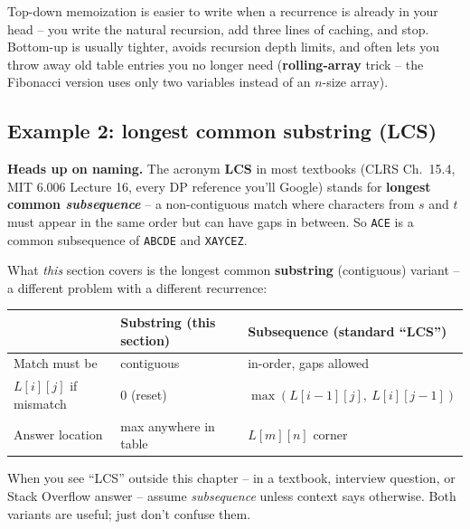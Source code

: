 \documentclass[11pt]{article}
\begin{document}
\begin{ideabox}
Top-down memoization is easier to write when a recurrence is already
in your head -- you write the natural recursion, add three lines of
caching, and stop. Bottom-up is usually tighter, avoids recursion
depth limits, and often lets you throw away old table entries you no
longer need (\textbf{rolling-array} trick -- the Fibonacci version
uses only two variables instead of an $n$-size array).
\end{ideabox}

\subsection{Example 2: longest common substring (LCS)}

\begin{notebox}
\textbf{Heads up on naming.} The acronym \textbf{LCS} in most
textbooks (CLRS Ch.~15.4, MIT 6.006 Lecture 16, every DP reference
you'll Google) stands for \textbf{longest common \emph{subsequence}}
-- a non-contiguous match where characters from $s$ and $t$ must
appear in the same order but can have gaps in between. So
\texttt{ACE} is a common subsequence of \texttt{ABCDE} and
\texttt{XAYCEZ}.

What \emph{this} section covers is the longest common
\textbf{substring} (contiguous) variant -- a different problem with
a different recurrence:

\begin{center}
\small
\begin{tabular}{lll}
& \textbf{Substring (this section)} & \textbf{Subsequence (standard ``LCS'')} \\
\hline
Match must be          & contiguous          & in-order, gaps allowed \\
$L[i][j]$ if mismatch  & $0$ (reset)         & $\max(L[i{-}1][j],\ L[i][j{-}1])$ \\
Answer location        & max anywhere in table & $L[m][n]$ corner \\
\end{tabular}
\normalsize
\end{center}

When you see ``LCS'' outside this chapter -- in a textbook,
interview question, or Stack Overflow answer -- assume
\emph{subsequence} unless context says otherwise. Both variants are
useful; just don't confuse them.
\end{notebox}
\end{document}

